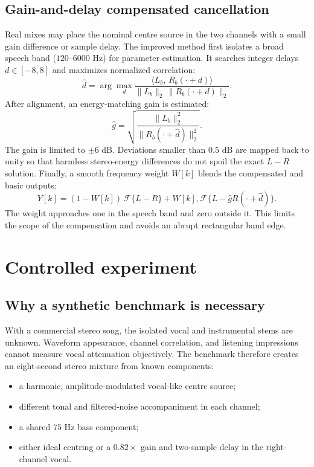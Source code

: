 \documentclass[11pt,a4paper]{article}
\begin{document}
\subsection{Gain-and-delay compensated cancellation}

Real mixes may place the nominal centre source in the two channels with a small
gain difference or sample delay. The improved method first isolates a broad
speech band ($120$--$6000$ Hz) for parameter estimation. It searches integer
delays $d\in[-8,8]$ and maximizes normalized correlation:
\begin{equation}
  \hat d=\arg\max_d
  \frac{\langle L_b,\,R_b(\cdot+d)\rangle}
  {\|L_b\|_2\,\|R_b(\cdot+d)\|_2}.
\end{equation}
After alignment, an energy-matching gain is estimated:
\begin{equation}
  \hat g=\sqrt{\frac{\|L_b\|_2^2}{\|R_b(\cdot+\hat d)\|_2^2}}.
\end{equation}
The gain is limited to $\pm6$ dB. Deviations smaller than $0.5$ dB are mapped
back to unity so that harmless stereo-energy differences do not spoil the exact
$L-R$ solution. Finally, a smooth frequency weight $W[k]$ blends the compensated
and basic outputs:
\begin{equation}
  Y[k]=(1-W[k])\,\mathcal{F}\{L-R\}
  +W[k],\mathcal{F}\{L-\hat gR(\cdot+\hat d)\}.
\end{equation}
The weight approaches one in the speech band and zero outside it. This limits
the scope of the compensation and avoids an abrupt rectangular band edge.

\section{Controlled experiment}

\subsection{Why a synthetic benchmark is necessary}

With a commercial stereo song, the isolated vocal and instrumental stems are
unknown. Waveform appearance, channel correlation, and listening impressions
cannot measure vocal attenuation objectively. The benchmark therefore creates
an eight-second stereo mixture from known components:
\begin{itemize}
  \item a harmonic, amplitude-modulated vocal-like centre source;
  \item different tonal and filtered-noise accompaniment in each channel;
  \item a shared $75$ Hz bass component;
  \item either ideal centring or a $0.82\times$ gain and two-sample delay in the
  right-channel vocal.
\end{itemize}
\end{document}
